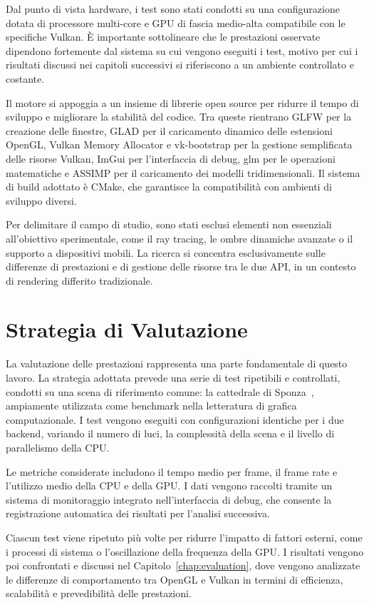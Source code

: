 \documentclass[12pt,a4paper,openright,twoside]{book}
\begin{document}
Dal punto di vista hardware, i test sono stati condotti su una configurazione dotata di processore multi-core e GPU
di fascia medio-alta compatibile con le specifiche Vulkan. È importante sottolineare che le prestazioni osservate
dipendono fortemente dal sistema su cui vengono eseguiti i test, motivo per cui i risultati discussi nei capitoli
successivi si riferiscono a un ambiente controllato e costante.

Il motore si appoggia a un insieme di librerie open source per ridurre il tempo di sviluppo e migliorare la stabilità
del codice. Tra queste rientrano GLFW per la creazione delle finestre, GLAD per il caricamento dinamico delle estensioni
OpenGL, Vulkan Memory Allocator e vk-bootstrap per la gestione semplificata delle risorse Vulkan, ImGui per
l'interfaccia di debug, glm per le operazioni matematiche e ASSIMP per il caricamento dei modelli tridimensionali.
Il sistema di build adottato è CMake, che garantisce la compatibilità con ambienti di sviluppo diversi.

Per delimitare il campo di studio, sono stati esclusi elementi non essenziali all'obiettivo sperimentale, come il
ray tracing, le ombre dinamiche avanzate o il supporto a dispositivi mobili. La ricerca si concentra esclusivamente
sulle differenze di prestazioni e di gestione delle risorse tra le due API, in un contesto di rendering differito
tradizionale.

\section{Strategia di Valutazione}
La valutazione delle prestazioni rappresenta una parte fondamentale di questo lavoro. La strategia adottata prevede
una serie di test ripetibili e controllati, condotti su una scena di riferimento comune: la cattedrale di
Sponza~\cite{sponza_original,sponza_intel2022}, ampiamente utilizzata come benchmark nella letteratura di grafica
computazionale. I test vengono eseguiti con configurazioni identiche per i due backend, variando il numero di luci,
la complessità della scena e il livello di parallelismo della CPU.

Le metriche considerate includono il tempo medio per frame, il frame rate e l'utilizzo medio della CPU e della GPU.
I dati vengono raccolti tramite un sistema di monitoraggio integrato nell'interfaccia di debug, che consente la
registrazione automatica dei risultati per l'analisi successiva.

Ciascun test viene ripetuto più volte per ridurre l'impatto di fattori esterni, come i processi di sistema o
l'oscillazione della frequenza della GPU. I risultati vengono poi confrontati e discussi nel
Capitolo~\ref{chap:evaluation}, dove vengono analizzate le differenze di comportamento tra OpenGL e Vulkan in termini
di efficienza, scalabilità e prevedibilità delle prestazioni.
\end{document}
